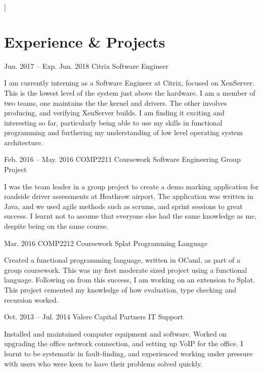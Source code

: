 \documentclass{tccv}
\begin{document}
\hline
\bigskip
]

\section{Experience \& Projects}

    \begin{eventlist}
        \item{Jun. 2017 -- Exp. Jun. 2018}
             {Citrix}
             {Software Engineer}

        I am currently interning as a Software Engineer at Citrix, focused on XenServer. This is the lowest level of the system just above the hardware. I am a member of two teams, one maintains the the kernel and drivers. The other involves producing, and verifying XenServer builds. I am finding it exciting and interesting so far, particularly being able to use my skills in functional programming and furthering my understanding of low level operating system architecture.

        \item{Feb. 2016 -- May. 2016}
             {COMP2211 Coursework}
             {Software Engineering Group Project}

        I was the team leader in a group project to create a demo marking application for roadside driver assessments at Heathrow airport. The application was written in Java, and we used agile methods such as scrums, and sprint sessions to great success. I learnt not to assume that everyone else had the same knowledge as me, despite being on the same course.

        \item{Mar. 2016}
             {COMP2212 Coursework}
             {Splat Programming Language}

        Created a functional programming language, written in OCaml, as part of a group coursework. This was my first moderate sized project using a functional language. Following on from this success, I am working on an extension to Splat. This project cemented my knowledge of how evaluation, type checking and recursion worked.\newline\newline

        \item{Oct. 2013 -- Jul. 2014}
             {Valere Capital Partners}
             {IT Support}

        Installed and maintained computer equipment and software. Worked on upgrading the office network connection, and setting up VoIP for the office. I learnt to be systematic in fault-finding, and experienced working under pressure with users who were keen to have their problems solved quickly.



\end{eventlist}
\end{document}
